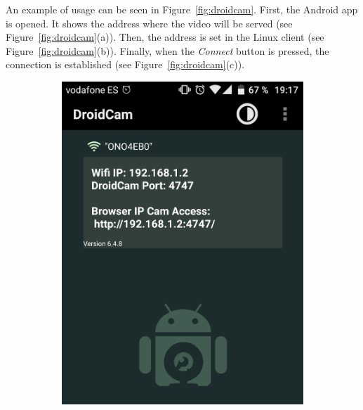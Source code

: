 An example of usage can be seen in Figure~\ref{fig:droidcam}. First, the Android app is opened. It shows the address where the video will be served (see Figure~\ref{fig:droidcam}(a)). Then, the address is set in the Linux client (see Figure~\ref{fig:droidcam}(b)). Finally, when the \textit{Connect} button is pressed, the connection is established (see Figure~\ref{fig:droidcam}(c)).
\begin{figure}
	\centering
	\begin{subfigure}{0.33\textwidth}
		\centering
		\includegraphics[width=0.9\linewidth]{figures/droidcampre.png}
		\caption{}
	\end{subfigure}%
	\begin{subfigure}{0.33\textwidth}
		\centering

\end{subfigure}
\end{figure}
